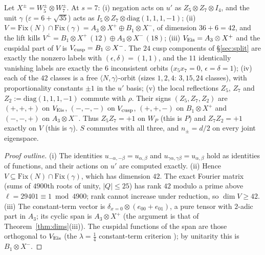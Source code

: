 
\begin{proposition}\label{prop:matched}
Let $X^\pm=W_5^\pm\otimes W_7^\pm$. At $s=7$:
(i) negation acts on $u'$ as $Z_5\otimes Z_7\otimes I_4$, and the unit $\gamma$ ($\varepsilon=6+\sqrt{35}$) acts as $I_5\otimes Z_7\otimes\mathrm{diag}(1,1,1,-1)$;
(ii) $V=\mathrm{Fix}(N)\cap\mathrm{Fix}(\gamma)=A_3\otimes X^+\oplus B_1\otimes X^-$, of dimension $36+6=42$, and the lift kills
$V^\perp=B_1\otimes X^+\,(12)\oplus A_3\otimes X^-\,(18)$;
(iii) $V_{\rm Eis}=A_3\otimes X^+$ and the cuspidal part of $V$ is $V_{\rm cusp}=B_1\otimes X^-$. The $24$ cusp components of \S\ref{sec:split} are exactly the nonzero
labels with $(\epsilon,\delta)=(1,1)$, and the $11$ identically vanishing labels are exactly the $6$ inconsistent orbits ($x_5x_7=0$, $\epsilon=\delta=1$);
(iv) each of the $42$ classes is a free $\langle N,\gamma\rangle$-orbit (sizes $1,2,4$: $3,15,24$ classes), with proportionality constants $\pm1$ in the $u'$ basis;
(v) the local reflections $Z_5$, $Z_7$ and $Z_2:=\mathrm{diag}(1,1,1,-1)$ commute with $\rho$. Their signs $(Z_5,Z_7,Z_2)$ are $(+,+,+)$ on $V_{\rm Eis}$, $(-,-,-)$ on $V_{\rm cusp}$,
$(+,+,-)$ on $B_1\otimes X^+$ and $(-,-,+)$ on $A_3\otimes X^-$. Thus $Z_5Z_7=+1$ on $W_P$ (this is $P$) and $Z_7Z_2=+1$ exactly on $V$ (this is $\gamma$).
$S$ commutes with all three, and $n_\pm=d/2$ on every joint eigenspace.
\end{proposition}
\begin{proof}[Proof outline]
(i) The identities $u_{-\alpha,-\beta}=u_{\alpha,\beta}$ and $u_{\gamma\alpha,\gamma\beta}=u_{\alpha,\beta}$ hold as identities of functions, and their actions on $u'$ are computed exactly.
(ii) Hence $V\subseteq\mathrm{Fix}(N)\cap\mathrm{Fix}(\gamma)$, which has dimension $42$. The exact Fourier matrix (sums of $4900$th roots of unity, $|Q|\le25$) has rank $42$
modulo a prime above $\ell=29401\equiv1\bmod4900$; rank cannot increase under reduction, so $\dim V\ge42$. (iii) The constant-term vector is
$\delta_{x=0}\otimes(e_{00}+e_{01})$, a pure tensor with $2$-adic part in $A_3$; its cyclic span is $A_3\otimes X^+$ (the argument is that of Theorem~\ref{thm:dims}(iii)).
The cuspidal functions of the span are those orthogonal to $V_{\rm Eis}$ (the $\lambda=\tfrac14$ constant-term criterion ); by unitarity this is $B_1\otimes X^-$.
\end{proof}
